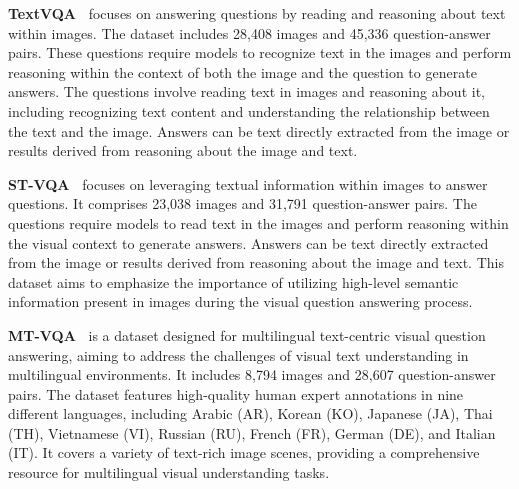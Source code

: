 \noindent \textbf{TextVQA~\cite{singh2019towards}} focuses on answering questions by reading and reasoning about text within images. The dataset includes 28,408 images and 45,336 question-answer pairs. These questions require models to recognize text in the images and perform reasoning within the context of both the image and the question to generate answers. The questions involve reading text in images and reasoning about it, including recognizing text content and understanding the relationship between the text and the image. Answers can be text directly extracted from the image or results derived from reasoning about the image and text.

\noindent \textbf{ST-VQA~\cite{biten2019scene}} focuses on leveraging textual information within images to answer questions. It comprises 23,038 images and 31,791 question-answer pairs. The questions require models to read text in the images and perform reasoning within the visual context to generate answers. Answers can be text directly extracted from the image or results derived from reasoning about the image and text. This dataset aims to emphasize the importance of utilizing high-level semantic information present in images during the visual question answering process.


\noindent \textbf{MT-VQA~\cite{wen2024mt}} is a dataset designed for multilingual text-centric visual question answering, aiming to address the challenges of visual text understanding in multilingual environments. It includes 8,794 images and 28,607 question-answer pairs. The dataset features high-quality human expert annotations in nine different languages, including Arabic (AR), Korean (KO), Japanese (JA), Thai (TH), Vietnamese (VI), Russian (RU), French (FR), German (DE), and Italian (IT). It covers a variety of text-rich image scenes, providing a comprehensive resource for multilingual visual understanding tasks.



